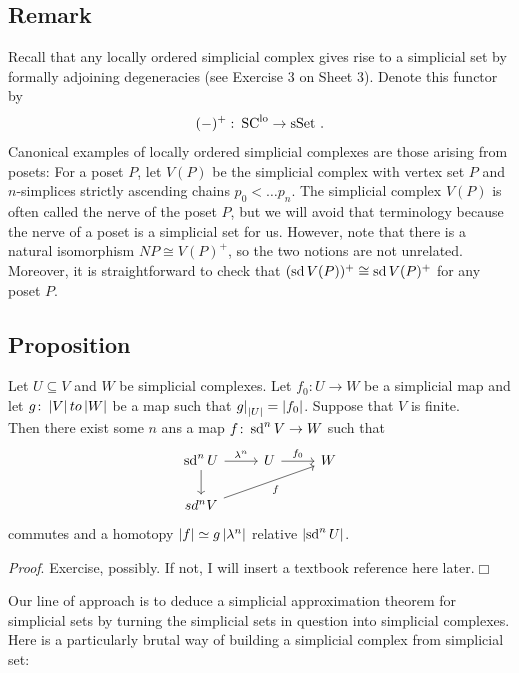     \subsection{Remark}\label{chV-5-9}
        Recall that any locally ordered simplicial complex gives rise to a simplicial set by formally adjoining degeneracies (see Exercise 3 on Sheet 3). Denote this functor by
        \begin{equation*}
            (-)^{+} \,\colon \operatorname{SC}^{\operatorname{lo}} \to \operatorname{sSet} \,.
        \end{equation*}
        Canonical examples of locally ordered simplicial complexes are those arising from posets: For a poset $P$, let $V(P)$ be the simplicial complex with vertex set $P$ and $n$-simplices strictly ascending chains $p_0 < \ldots p_n$. The simplicial complex $V(P)$ is often called the nerve of the poset $P$, but we will avoid that terminology because the nerve of a poset is a simplicial set for us. However, note that there is a natural isomorphism $NP \cong V(P)^{+}$, so the two notions are not unrelated.\\
        Moreover, it is straightforward to check that $(\operatorname{sd} V(P))^{+} \cong \operatorname{sd} V(P)^{+}$ for any poset $P$.

    \subsection{Proposition}\label{chV-5-10}
        Let $U \subseteq V$ and $W$ be simplicial complexes. Let $f_0 \colon U \to W$ be a simplicial map and let $g \colon \left| V \right| to \left| W \right|$ be a map such that ${g|}_{\left| U \right|} = \left| f_0 \right|$. Suppose that $V$ is finite.\\
        Then there exist some $n$ ans a map $f \colon \operatorname{sd}^n V \to W$ such that
        \begin{equation*}
            \begin{tikzcd}
                \sd^n U \arrow[d] \arrow[r, "\lambda^n"] & U \arrow[r, "f_0"] & W \\
                sd^n V \arrow[urr, "f"'] & &
            \end{tikzcd}
        \end{equation*}
        commutes and a homotopy $\left| f \right| \simeq g \left| \lambda^n \right|$ relative $\left| \operatorname{sd}^n U \right|$.
        \smallskip

        \emph{Proof}. Exercise, possibly. If not, I will insert a textbook reference here later.\hfill$\Box$
        \medskip

        Our line of approach is to deduce a simplicial approximation theorem for simplicial sets by turning the simplicial sets in question into simplicial complexes. Here is a particularly brutal way of building a simplicial complex from simplicial set:

